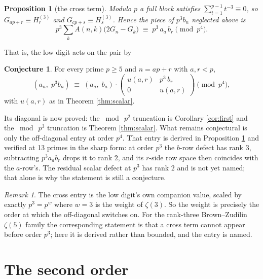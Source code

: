 \documentclass[11pt,a4paper]{amsart}
\theoremstyle{plain}
\newtheorem{proposition}[theorem]{Proposition}
\theoremstyle{definition}
\newtheorem{conjecture}[theorem]{Conjecture}
\theoremstyle{remark}
\newtheorem{remark}[theorem]{Remark}
\newcommand{\A}{A}
\begin{document}
\begin{proposition}[the cross term]\label{prop:cross}
Modulo $p$ a full block satisfies $\sum_{t=1}^{p-1}t^{-3}\equiv0$, so
$G_{ap+r}\equiv H^{(3)}_r$ and $G_{cp+s}\equiv H^{(3)}_s$. Hence the piece of $p^3b_n$
neglected above is
\[
  p^3\sum_k \A(n,k)\bigl(2G_n-G_k\bigr)\;\equiv\;p^3\,a_a\,b_r \pmod {p^4}.
\]
\end{proposition}

That is, the low digit acts on the pair by

\begin{conjecture}\label{conj:matrix}
For every prime $p\ge5$ and $n=ap+r$ with $a,r<p$,
\[
  (a_n,\;p^3b_n)\;\equiv\;(a_a,\;b_a)\cdot
  \begin{pmatrix} u(a,r) & p^3\,b_r\\[2pt] 0 & u(a,r)\end{pmatrix}
  \pmod{p^4},
\]
with $u(a,r)$ as in Theorem \ref{thm:scalar}.
\end{conjecture}

Its diagonal is now proved: the $\bmod\ p^2$ truncation is Corollary \ref{cor:first} and
the $\bmod\ p^3$ truncation is Theorem \ref{thm:scalar}. What remains conjectural is only
the off-diagonal entry at order $p^4$. That entry is derived in Proposition
\ref{prop:cross} and verified at 13 primes in the sharp form: at order $p^3$ the $b$-row
defect has rank $3$, subtracting $p^3a_ab_r$ drops it to rank $2$, and its $r$-side row
space then coincides with the $a$-row's. The residual scalar defect at $p^3$ has rank $2$
and is not yet named; that alone is why the statement is still a conjecture.

\begin{remark}
The cross entry is the low digit's own companion value, scaled by exactly $p^{3}=p^{w}$
where $w=3$ is the weight of $\zeta(3)$. So the weight is precisely the order at which
the off-diagonal switches on. For the rank-three Brown--Zudilin $\zeta(5)$ family the
corresponding statement is that a cross term cannot appear before order $p^3$; here it
is derived rather than bounded, and the entry is named.
\end{remark}

\section{The second order}\label{sec:second}
\end{document}
